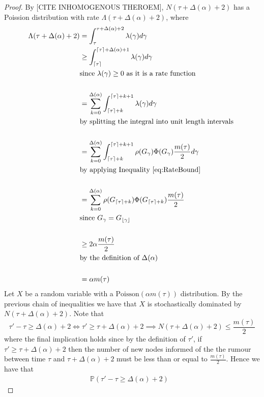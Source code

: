 \documentclass[a4paper,11pt]{article}
\theoremstyle{definition}
\DeclarePairedDelimiter\ceil{\lceil}{\rceil}
\DeclarePairedDelimiter\floor{\lfloor}{\rfloor}
\begin{document}
\begin{proof}
	By [CITE INHOMOGENOUS THEROEM], $N(\tau + \Delta(\alpha) + 2)$ has a Poission distribution with rate $\Lambda(\tau + \Delta(\alpha) + 2)$, where
	\begin{align*}
		\Lambda(\tau + \Delta(\alpha) + 2) &= \int_\tau^{\tau + \Delta(\alpha) + 2} \lambda(\gamma) d\gamma \\
		& \geq \int_{\ceil\tau}^{{\ceil\tau} + \Delta(\alpha) + 1} \lambda(\gamma) d\gamma \\
		& \text{since } \lambda(\gamma) \geq 0 \text{ as it is a rate function}\\
		& \\
		& = \sum_{k=0}^{\Delta(\alpha)} \int_{\ceil\tau + k}^{{\ceil\tau} + k + 1} \lambda(\gamma) d\gamma \\
		& \text{by splitting the integral into unit length intervals } \\
		& \\
		& = \sum_{k=0}^{\Delta(\alpha)} \int_{\ceil\tau + k}^{{\ceil\tau} + k + 1} \rho(G_\gamma)\Phi(G_\gamma)\frac{m(\tau)}{2} d\gamma \\
		& \text{by applying Inequality } \ref{eq:RateBound} \\
		& \\
		& = \sum_{k=0}^{\Delta(\alpha)} \rho(G_{\ceil\tau + k})\Phi(G_{\ceil\tau + k})\frac{m(\tau)}{2} \\
		& \text{since } G_\gamma = G_{\floor\gamma} \\
		& \\
		& \geq 2\alpha\frac{m(\tau)}{2} \\
		& \text{by the definition of } \Delta(\alpha) \\
		& \\
		& = \alpha m(\tau)
	\end{align*}
	Let $X$ be a random variable with a $\text{Poisson}(\alpha m(\tau))$ distribution. 
	By the previous chain of inequalities we have that $X$ is stochastically dominated by $N(\tau + \Delta(\alpha) + 2)$. %
	Note that
	$$
		\tau' - \tau \geq \Delta(\alpha) + 2 \iff 
		\tau' \geq \tau + \Delta(\alpha) + 2 \implies 
		N(\tau + \Delta(\alpha) + 2) \leq \frac{m(\tau)}{2}
	$$
	where the final implication holds since by the definition of $\tau'$, if $\tau' \geq \tau + \Delta(\alpha) + 2$ then the number of new nodes informed of the the rumour between time $\tau$ and $\tau + \Delta(\alpha) + 2$ must be less than or equal to $\frac{m(\tau)}{2}$. Hence we have that
	\begin{align*}
		\mathbb{P}(\tau' - \tau \geq \Delta(\alpha) + 2) & 

\end{align*}
\end{proof}
\end{document}
